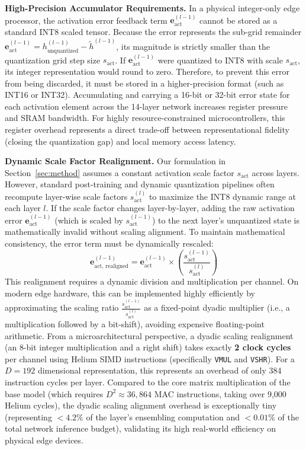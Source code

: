 \documentclass{article}
\theoremstyle{plain}
\theoremstyle{definition}
\theoremstyle{remark}
\begin{document}
\textbf{High-Precision Accumulator Requirements.} In a physical integer-only edge processor, the activation error feedback term $\mathbf{e}_{\text{act}}^{(l-1)}$ cannot be stored as a standard INT8 scaled tensor. Because the error represents the sub-grid remainder $\mathbf{e}_{\text{act}}^{(l-1)} = h^{(l-1)}_{\text{unquantized}} - \tilde{h}^{(l-1)}$, its magnitude is strictly smaller than the quantization grid step size $s_{\text{act}}$. If $\mathbf{e}_{\text{act}}^{(l-1)}$ were quantized to INT8 with scale $s_{\text{act}}$, its integer representation would round to zero. 
Therefore, to prevent this error from being discarded, it must be stored in a higher-precision format (such as INT16 or INT32). Accumulating and carrying a 16-bit or 32-bit error state for each activation element across the 14-layer network increases register pressure and SRAM bandwidth. For highly resource-constrained microcontrollers, this register overhead represents a direct trade-off between representational fidelity (closing the quantization gap) and local memory access latency.

\textbf{Dynamic Scale Factor Realignment.} Our formulation in Section~\ref{sec:method} assumes a constant activation scale factor $s_{\text{act}}$ across layers. However, standard post-training and dynamic quantization pipelines often recompute layer-wise scale factors $s_{\text{act}}^{(l)}$ to maximize the INT8 dynamic range at each layer $l$. 
If the scale factor changes layer-by-layer, adding the raw activation error $\mathbf{e}_{\text{act}}^{(l-1)}$ (which is scaled by $s_{\text{act}}^{(l-1)}$) to the next layer's unquantized state is mathematically invalid without scaling alignment. To maintain mathematical consistency, the error term must be dynamically rescaled:
\begin{equation}
    \mathbf{e}_{\text{act, realigned}}^{(l-1)} = \mathbf{e}_{\text{act}}^{(l-1)} \times \left( \frac{s_{\text{act}}^{(l-1)}}{s_{\text{act}}^{(l)}} \right)
\end{equation}
This realignment requires a dynamic division and multiplication per channel. On modern edge hardware, this can be implemented highly efficiently by approximating the scaling ratio $\frac{s_{\text{act}}^{(l-1)}}{s_{\text{act}}^{(l)}}$ as a fixed-point dyadic multiplier (i.e., a multiplication followed by a bit-shift), avoiding expensive floating-point arithmetic. 
From a microarchitectural perspective, a dyadic scaling realignment (an 8-bit integer multiplication and a right shift) takes exactly \textbf{2 clock cycles} per channel using Helium SIMD instructions (specifically \texttt{VMUL} and \texttt{VSHR}). For a $D=192$ dimensional representation, this represents an overhead of only 384 instruction cycles per layer. Compared to the core matrix multiplication of the base model (which requires $D^2 \approx 36,864$ MAC instructions, taking over 9,000 Helium cycles), the dyadic scaling alignment overhead is exceptionally tiny (representing $<4.2\%$ of the layer's ensembling computation and $<0.01\%$ of the total network inference budget), validating its high real-world efficiency on physical edge devices.
\end{document}
